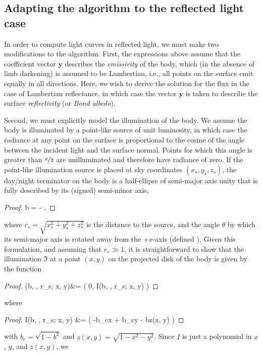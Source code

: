 \documentclass[modern]{aastex62}
\begin{document}
\subsection{Adapting the algorithm to the reflected light case}
\label{sec:starry-review}
%
In order to compute light curves in reflected light, we must make two
modifications to the \starry algorithm. First,
the expressions above assume that the coefficient vector
$\mathbf{y}$ describes the \emph{emissivity} of the body, which (in the
absence of limb darkening) is assumed to be Lambertian, i.e., all points on the
surface emit equally in all directions.
Here, we wish to derive the solution for the flux in the case of Lambertian
reflectance, in which case the vector $\mathbf{y}$ is taken to describe the
surface \emph{reflectivity} (or \emph{Bond albedo}).

Second, we must explicitly model the illumination of the body. We assume the
body is illuminated by a point-like source of unit luminosity, in which case
the radiance at any
point on the surface is proportional to the cosine of the angle between
the incident light and the surface normal. Points for which
this angle is greater than $\nicefrac{\pi}{2}$ are unilluminated and
therefore have radiance of zero.
%
If the point-like illumination source is placed at sky coordinates
$(x_s, y_s, z_s)$, the day/night terminator on the body is a half-ellipse
of semi-major axis unity that is fully described by its (signed) semi-minor
axis,
%
\begin{proof}{}
    \label{eq:b}
    b = -
    \quad,
\end{proof}
%
where $r_s = \sqrt{x_s^2 + y_s^2 + z_s^2}$ is the distance to the source,
%
and the angle $\theta$ by which its semi-major axis is rotated away from the
$+x$-axis (defined ).
Given this formulation, and assuming that
$r_s \gg 1$,
it is straightforward to show that the illumination
$\mathfrak{I}$ at a point $(x, y)$ on the projected disk of the body is given
by the function
%
\begin{proof}{}
    \label{eq:illum}
    (b, \theta, r_s; x, y)&=
    \bigg( 0, I(b, \theta, r_s; x, y) \bigg)
\end{proof}
%
where
%
\begin{proof}{}
    I(b, \theta, r_s; x, y) &= 
    \bigg(
    -b_c\sin\theta x + b_c\cos\theta y - bz(x, y)
    \bigg)
\end{proof}
%
with $b_c = \sqrt{1 - b^2}$ and $z(x, y) = \sqrt{1 - x^2 - y^2}$.
%
Since $I$ is just a polynomial in $x$, $y$, and $z(x, y)$, we
\end{document}
